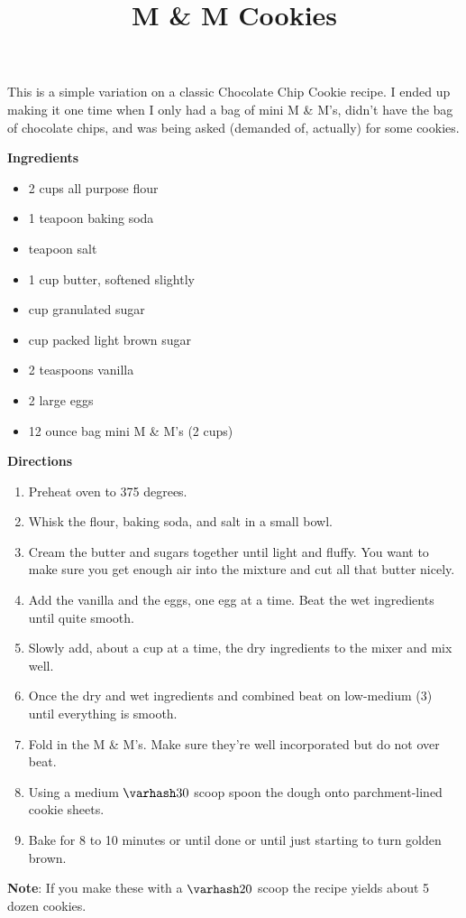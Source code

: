 \documentclass{article}
\title{M \& M  Cookies}
\begin{document}
This is a simple variation on a classic Chocolate Chip Cookie recipe. I ended up making it one
time when I only had a bag of mini M \& M's, didn't have the bag of chocolate chips, and was being
asked (demanded of, actually) for some cookies.

\textbf{Ingredients}

\begin{multicols}{2}
      \begin{itemize}
            \item 2 cups all purpose flour
            \item 1 teapoon baking soda
            \item {} teapoon salt

            \item 1 cup butter, softened slightly
            \item {} cup granulated sugar
            \item {} cup packed light brown sugar

            \item 2 teaspoons vanilla
            \item 2 large eggs
            \item 12 ounce bag mini M \& M's (2 cups)
      \end{itemize}
\end{multicols}

\textbf{Directions}

\begin{enumerate}
      \item Preheat oven to 375 degrees.
      \item Whisk the flour, baking soda, and salt in a small bowl.
      \item Cream the butter and sugars together until light and fluffy. You want to make sure you get
            enough air into the mixture and cut all that butter nicely.
      \item Add the vanilla and the eggs, one egg at a time. Beat the wet ingredients until quite smooth.
      \item Slowly add, about a cup at a time, the dry ingredients to the mixer and mix well.
      \item Once the dry and wet ingredients and combined beat on low-medium (3) until
            everything is smooth.
      \item Fold in the M \& M's. Make sure they're well incorporated but do not over beat.
      \item Using a medium $\varhash 30$ scoop spoon the dough onto parchment-lined cookie sheets.
      \item Bake for 8 to 10 minutes or until done or until just starting to turn golden brown.
\end{enumerate}

\medskip

\textbf{Note}: If you make these with a $\varhash 20$ scoop the recipe yields about 5 dozen cookies.

\end{document}
